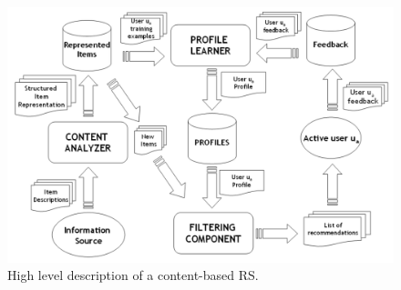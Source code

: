 \begin{figure}[h]
    \includegraphics[scale=0.3]{inc/rocchio/HighlevelContentBased}
    \caption{High level description of a content-based RS.\citep[p.~76]{lops:2011}}
    \label{fig:framework-contentbasedrs}
\end{figure}

